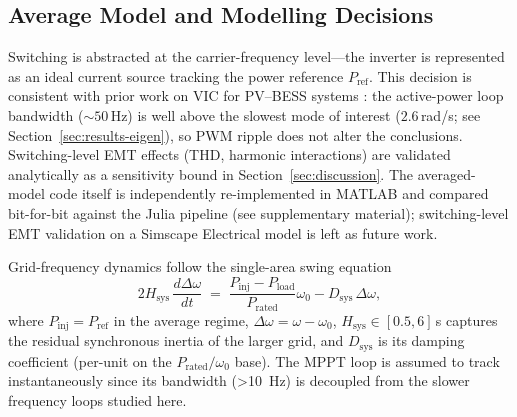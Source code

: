 \documentclass[journal]{IEEEtran}
\begin{document}
\subsection{Average Model and Modelling Decisions}
Switching is abstracted at the carrier-frequency level---the inverter
is represented as an ideal current source tracking the power
reference $P_\mathrm{ref}$. This decision is consistent with prior work
on VIC for PV--BESS systems
\cite{liu2025cooperative,islam2024novel,wang2024adaptive}: the
active-power loop bandwidth ($\sim 50\,$Hz) is well above the slowest
mode of interest ($2.6\,$rad/s; see Section~\ref{sec:results-eigen}),
so PWM ripple does not alter the conclusions.
Switching-level EMT effects (THD, harmonic interactions) are validated
analytically as a sensitivity bound in Section~\ref{sec:discussion}.
The averaged-model code itself is independently re-implemented in
MATLAB and compared bit-for-bit against the Julia pipeline (see
supplementary material); switching-level EMT validation on a Simscape
Electrical model is left as future work.

Grid-frequency dynamics follow the single-area swing equation
\cite{kundur1994stability}
\begin{equation}
2H_\mathrm{sys}\,\frac{d\Delta\omega}{dt}
\;=\;\frac{P_\mathrm{inj}-P_\mathrm{load}}{P_\mathrm{rated}}\omega_0
-D_\mathrm{sys}\,\Delta\omega,
\label{eq:swing}
\end{equation}
where $P_\mathrm{inj}=P_\mathrm{ref}$ in the average regime,
$\Delta\omega=\omega-\omega_0$, $H_\mathrm{sys}\in[0.5,6]\,$s captures
the residual synchronous inertia of the larger grid, and
$D_\mathrm{sys}$ is its damping coefficient (per-unit on the
$P_\mathrm{rated}/\omega_0$ base). The MPPT loop is assumed to track
instantaneously since its bandwidth (\SI{>10}{\Hz}) is decoupled from
the slower frequency loops studied here.
\end{document}
